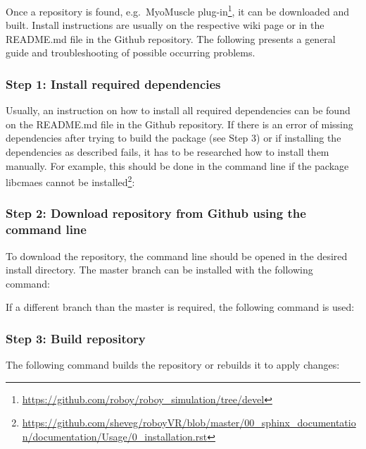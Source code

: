 Once a repository is found, e.g.\ MyoMuscle plug-in\footnote{\url{https://github.com/roboy/roboy_simulation/tree/devel}}, it can be downloaded and built. Install instructions are usually on the respective wiki page or in the README.md file in the Github repository. The following presents a general guide and troubleshooting of possible occurring problems. 

\subsubsection*{Step 1: Install required dependencies}
Usually, an instruction on how to install all required dependencies can be found on the README.md file in the Github repository. If there is an error of missing dependencies after trying to build the package (see Step 3) or if installing the dependencies as described fails, it has to be researched how to install them manually. For example, this should be done in the command line if the package libcmaes cannot be installed\footnote{\url{https://github.com/sheveg/roboyVR/blob/master/00_sphinx_documentation/documentation/Usage/0_installation.rst}}:

\subsubsection*{Step 2: Download repository from Github using the command line}
To download the repository, the command line should be opened in the desired install directory. The master branch can be installed with the following command:

If a different branch than the master is required, the following command is used:

\subsubsection*{Step 3: Build repository}
The following command builds the repository or rebuilds it to apply changes:

